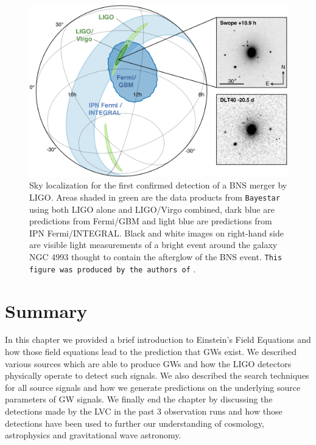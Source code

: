 \begin{figure}
    \centering
    \includegraphics[width=\linewidth]{figures/GW170817_skymap.jpg}
    \caption[Sky localization for the first confirmed detection of a \ac{BNS} merger by \ac{LIGO}.]{Sky localization for the first confirmed detection of a \ac{BNS} merger by \ac{LIGO}. Areas shaded in green are the data products from \texttt{Bayestar} using both \ac{LIGO} alone and \ac{LIGO}/Virgo combined, dark blue are predictions from Fermi/GBM and light blue are predictions from IPN Fermi/INTEGRAL. Black and white images on right-hand side are visible light measurements of a bright event around the galaxy NGC 4993 thought to contain the afterglow of the \ac{BNS} event. \texttt{This figure was produced by the authors of} \cite{2017arXiv171005833L}. }
    \label{fig:GW170817_skylocalization}
\end{figure}

\section{Summary}

In this chapter we provided a brief introduction to Einstein's 
Field Equations and how those field equations lead to the prediction 
that \ac{GW}s exist. We described various sources which are 
able to produce \ac{GW}s and how the \ac{LIGO} detectors physically operate 
to detect such signals. We also described the search techniques for 
all source signals and how we generate predictions on the underlying 
source parameters of \ac{GW} signals. We finally end the chapter by 
discussing the detections made by the \ac{LVC} in the past 3 observation 
runs and how those detections have been used to further our understanding
of cosmology, astrophysics and gravitational wave astronomy.

